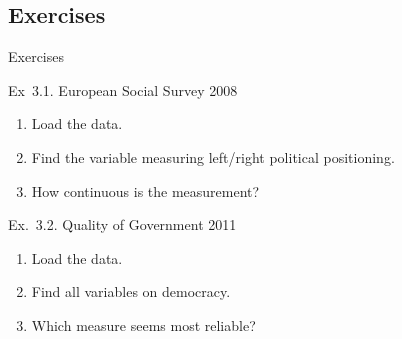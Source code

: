 \documentclass[t]{beamer}
\begin{document}
  \subsection{Exercises}
  
  \begin{frame}{Exercises}

    \begin{exampleblock}{Ex~3.1. European Social Survey 2008}
      \begin{enumerate}
        \item Load the data.
        \item Find the variable measuring left/right political positioning.
        \item How continuous is the measurement?
      \end{enumerate}
    \end{exampleblock}
		
    \begin{exampleblock}{Ex.~3.2. Quality of Government 2011}
      \begin{enumerate}
        \item Load the data.
        \item Find all variables on democracy.
        \item Which measure seems most reliable?
      \end{enumerate}
    \end{exampleblock}

  \end{frame}
  
\end{document}
